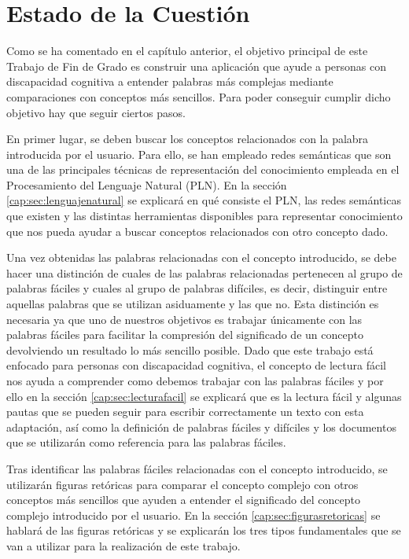 \chapter{Estado de la Cuestión}
\label{cap:estadoDeLaCuestion}

Como se ha comentado en el capítulo anterior, el objetivo principal de este Trabajo de Fin de Grado es construir una aplicación que ayude a personas con discapacidad cognitiva a entender palabras más complejas mediante comparaciones con conceptos más sencillos. Para poder conseguir cumplir dicho objetivo hay que seguir ciertos pasos.

En primer lugar, se deben buscar los conceptos relacionados con la palabra introducida por el usuario. Para ello, se han empleado redes semánticas que son una de las principales técnicas de representación del conocimiento empleada en el  Procesamiento del Lenguaje Natural (PLN). En la sección \ref{cap:sec:lenguajenatural} se explicará en qué consiste el PLN, las redes semánticas que existen y las distintas herramientas disponibles para representar conocimiento que nos pueda ayudar a buscar conceptos relacionados con otro concepto dado.

Una vez obtenidas las palabras relacionadas con el concepto introducido, se debe hacer una distinción de cuales de las palabras relacionadas pertenecen al grupo de palabras fáciles y cuales al grupo de palabras difíciles, es decir, distinguir entre aquellas palabras que se utilizan asiduamente y las que no.
Esta distinción es necesaria ya que uno de nuestros objetivos es trabajar únicamente con las palabras fáciles para facilitar la compresión del significado de un concepto devolviendo un resultado lo más sencillo posible. Dado que este trabajo está enfocado para personas con discapacidad cognitiva, el concepto de lectura fácil nos ayuda a comprender como debemos trabajar con las palabras fáciles y por ello en la sección \ref{cap:sec:lecturafacil} se explicará que es la lectura fácil y algunas pautas que se pueden seguir para escribir correctamente un texto con esta adaptación, así como la definición de palabras fáciles y difíciles y los documentos que se utilizarán como referencia para las palabras fáciles.

Tras identificar las palabras fáciles relacionadas con el concepto introducido, se utilizarán figuras retóricas para comparar el concepto complejo con otros conceptos más sencillos que ayuden a entender el significado del concepto complejo introducido por el usuario. En la sección \ref{cap:sec:figurasretoricas} se hablará de las figuras retóricas y se explicarán los tres tipos fundamentales que se van a utilizar para la realización de este trabajo. 

